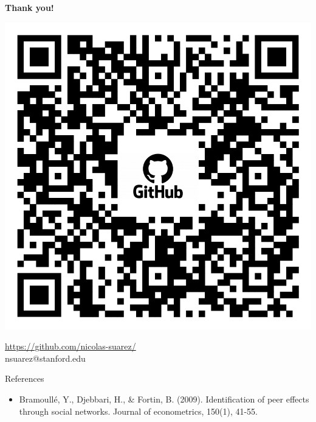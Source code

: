 \documentclass[aspectratio=169]{beamer}
\begin{document}
\begin{frame}
  \begin{center}
  \Huge \textbf{Thank you!}
  \end{center}
\centering
\includegraphics[scale=0.14]{QR.png}
  \begin{center}
  \url{https://github.com/nicolas-suarez/} \\
  nsuarez@stanford.edu
  \end{center}
\end{frame}



\appendix


\begin{frame}{References}
\begin{itemize}
\item Bramoullé, Y., Djebbari, H., \& Fortin, B. (2009). Identification of peer effects through social networks. Journal of econometrics, 150(1), 41-55.
\end{itemize}
\end{frame}
\end{document}
